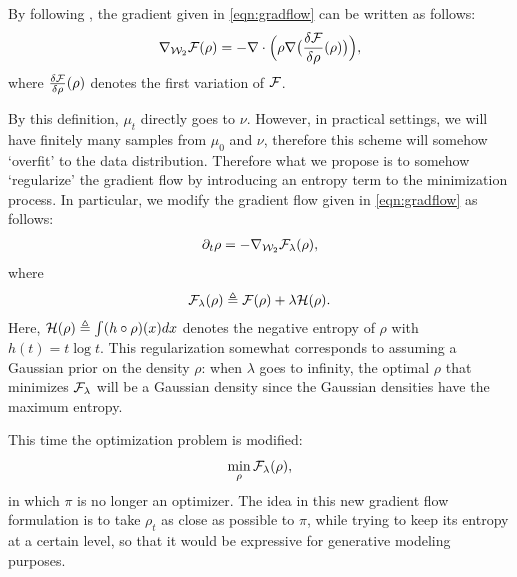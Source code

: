 \documentclass{article}
\newcommand{\W}{{\cal W}_2}
\newcommand{\F}{{\cal F}}
\newcommand{\He}{{\cal H}}
\begin{document}
By following \cite{santambrogio2017euclidean}, the gradient given in \eqref{eqn:gradflow} can be written as follows:
\begin{align}
\nabla_{\W} \F(\rho) = -\nabla \cdot \Bigl( \rho \nabla \bigl( \frac{\delta \F}{\delta \rho}(\rho) \bigr) \Bigr), \label{eqn:gradw2}
\end{align}
where $\frac{\delta \F}{\delta \rho}(\rho)$ denotes the first variation of $\F$.

By this definition, $\mu_t$ directly goes to $\nu$. However, in practical settings, we will have finitely many samples from $\mu_0$ and $\nu$, therefore this scheme will somehow `overfit' to the data distribution. Therefore what we propose is to somehow `regularize' the gradient flow by introducing an entropy term to the minimization process. In particular, we modify the gradient flow given in \eqref{eqn:gradflow} as follows:
\begin{align}
\partial_t \rho = - \nabla_{\W} \F_\lambda(\rho),
\end{align}
where
\begin{align}
\F_\lambda(\rho) \triangleq \F(\rho) + \lambda \He(\rho).
\end{align}
Here, $\He(\rho) \triangleq \int (h \circ \rho) (x) dx $ denotes the negative entropy of $\rho$ with $h(t) = t \log t$. This regularization somewhat corresponds to assuming a Gaussian prior on the density $\rho$: when $\lambda$ goes to infinity, the optimal $\rho$ that minimizes $\F_\lambda$ will be a Gaussian density since the Gaussian densities have the maximum entropy.

This time the optimization problem is modified:
\begin{align}
\min_\rho \F_\lambda(\rho),
\end{align}
in which $\pi$ is no longer an optimizer. The idea in this new gradient flow formulation is to take $\rho_t$ as close as possible to $\pi$, while trying to keep its entropy at a certain level, so that it would be expressive for generative modeling purposes.
\end{document}
